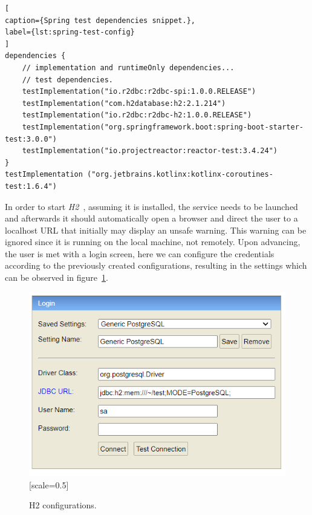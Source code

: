 \begin{lstlisting}[
caption={Spring test dependencies snippet.},
label={lst:spring-test-config}
]
dependencies {
    // implementation and runtimeOnly dependencies...
    // test dependencies.
    testImplementation("io.r2dbc:r2dbc-spi:1.0.0.RELEASE")
    testImplementation("com.h2database:h2:2.1.214")
    testImplementation("io.r2dbc:r2dbc-h2:1.0.0.RELEASE")
    testImplementation("org.springframework.boot:spring-boot-starter-test:3.0.0")
    testImplementation("io.projectreactor:reactor-test:3.4.24")
}
testImplementation ("org.jetbrains.kotlinx:kotlinx-coroutines-test:1.6.4")
\end{lstlisting}

In order to start \textit{H2}~\cite{h2-db}, assuming it is installed, the service needs to be launched and afterwards it should automatically open a browser and direct the user to a localhost URL that initially may display an unsafe warning. This warning can be ignored since it is running on the local machine, not remotely. Upon advancing, the user is met with a login screen, here we can configure the credentials according to the previously created configurations, resulting in the settings which can be observed in figure~\ref{fig:h2-login-config}.

\begin{figure}[H]
    \centering
    \includegraphics{Chapters/img/misc/h2-login-config.png}[scale=0.5]
    \caption{H2 configurations.}
    \label{fig:h2-login-config}
\end{figure}

